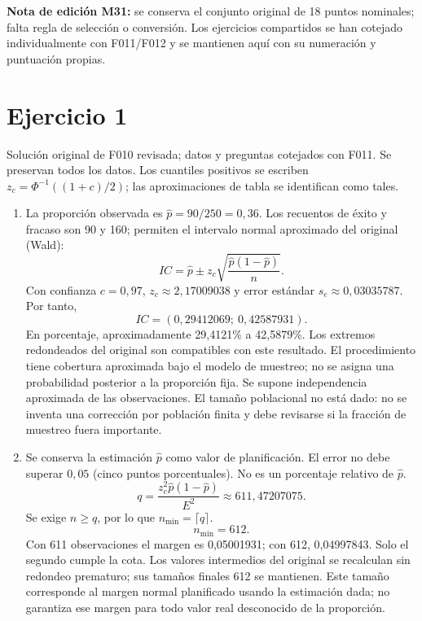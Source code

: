 \documentclass[11pt]{article}
\begin{document}
\textbf{Nota de edición M31:} se conserva el conjunto original de 18 puntos nominales; falta regla de selección o conversión. Los ejercicios compartidos se han cotejado individualmente con F011/F012 y se mantienen aquí con su numeración y puntuación propias.
\section*{Ejercicio 1}
Solución original de F010 revisada; datos y preguntas cotejados con F011. Se preservan todos los datos. Los cuantiles positivos se escriben $z_c=\Phi^{-1}((1+c)/2)$; las aproximaciones de tabla se identifican como tales.
\begin{enumerate}[label=(\alph*)]\item La proporción observada es $\widehat p=90/250=0,36$. Los recuentos de éxito y fracaso son 90 y 160; permiten el intervalo normal aproximado del original (Wald):
\[IC=\widehat p\pm z_c\sqrt{\frac{\widehat p(1-\widehat p)}{n}}.\]
Con confianza $c=0,97$, $z_c\approx2,17009038$ y error estándar $s_e\approx0,03035787$. Por tanto,
\[IC=\boxed{(0,29412069;\ 0,42587931)}.\]
En porcentaje, aproximadamente 29,4121\% a 42,5879\%. Los extremos redondeados del original son compatibles con este resultado.
El procedimiento tiene cobertura aproximada bajo el modelo de muestreo; no se asigna una probabilidad posterior a la proporción fija. Se supone independencia aproximada de las observaciones. El tamaño poblacional no está dado: no se inventa una corrección por población finita y debe revisarse si la fracción de muestreo fuera importante.
\item Se conserva la estimación $\widehat p$ como valor de planificación. El error no debe superar $0,05$ (cinco puntos porcentuales). No es un porcentaje relativo de $\widehat p$.
\[q=\frac{z_c^2\widehat p(1-\widehat p)}{E^2}\approx611,47207075.\]
Se exige $n\geq q$, por lo que $n_{\min}=\lceil q\rceil$.
\[\boxed{n_{\min}=612}.\]
Con 611 observaciones el margen es 0,05001931; con 612, 0,04997843. Solo el segundo cumple la cota.
Los valores intermedios del original se recalculan sin redondeo prematuro; sus tamaños finales 612 se mantienen. Este tamaño corresponde al margen normal planificado usando la estimación dada; no garantiza ese margen para todo valor real desconocido de la proporción.
\end{enumerate}
\clearpage
\end{document}
